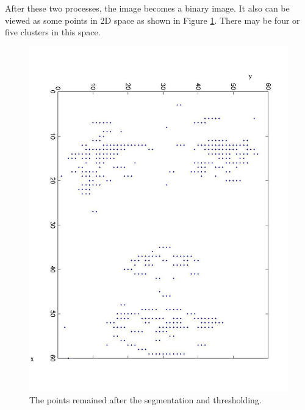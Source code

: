 After these two processes, the image becomes a binary image. It also can be viewed as some points in 2D space as shown in \mbox{Figure} \ref{fig:pointson2dspace}. There may be four or five clusters in this space. 
\begin{figure}[ht]
\begin{center}
 \includegraphics[width=0.66\columnwidth]{ch3/figures/pointson2dspace.png}
\caption{The points remained after the segmentation and thresholding.}
\label{fig:pointson2dspace}
\end{center}
\end{figure} 

